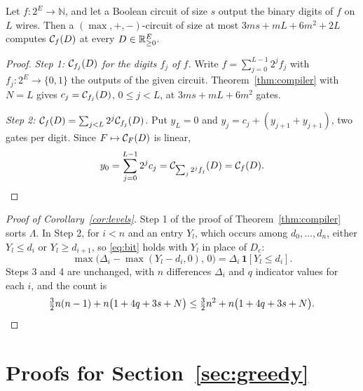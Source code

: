 \begin{corollary}
\label{cor:integer}
Let $f:2^{E}\to\mathbb N$, and let a Boolean circuit of size $s$ output the
binary digits of $f$ on $L$ wires.  Then a $(\max,+,-)$-circuit of size at
most $3ms+mL+6m^{2}+2L$ computes $\mathcal C_f(D)$ at every $D\in\mathbb R^{E}_{\ge0}$.
\end{corollary}

\begin{proof}
\emph{Step 1: $\mathcal C_{f_j}(D)$ for the digits $f_j$ of $f$.}  Write $f=\sum_{j=0}^{L-1}2^{j}f_j$ with
$f_j:2^{E}\to\{0,1\}$ the outputs of the given circuit.  Theorem~\ref{thm:compiler}
with $N=L$ gives $c_j=\mathcal C_{f_j}(D)$, $0\le j<L$, at $3ms+mL+6m^{2}$ gates.

\emph{Step 2: $\mathcal C_f(D)=\sum_{j<L}2^{j}\mathcal C_{f_j}(D)$.}  Put $y_L=0$ and $y_j=c_j+(y_{j+1}+y_{j+1})$, two
gates per digit.  Since $F\mapsto\mathcal C_F(D)$ is linear,
\[
  y_0=\sum_{j=0}^{L-1}2^{j}c_j=\mathcal C_{\sum_j2^{j}f_j}(D)=\mathcal C_f(D).\qedhere
\]
\end{proof}

\begin{proof}[Proof of Corollary~\ref{cor:levels}]
Step 1 of the proof of Theorem~\ref{thm:compiler} sorts $\Lambda$.  In Step 2, for
$i<n$ and an entry $Y_l$, which occurs among $d_0,\ldots,d_n$, either $Y_l\le d_i$
or $Y_l\ge d_{i+1}$, so \eqref{eq:bit} holds with $Y_l$ in place of $D_e$:
\[
  \max\bigl(\Delta_i-\max(Y_l-d_i,0),\,0\bigr)=\Delta_i\,\mathbf 1[Y_l\le d_i].
\]
Steps 3 and 4 are unchanged, with $n$ differences $\Delta_i$ and $q$ indicator values for each $i$, and
the count is
\[
  \tfrac32n(n-1)+n\bigl(1+4q+3s+N\bigr)\le\tfrac32n^{2}+n\bigl(1+4q+3s+N\bigr).\qedhere
\]
\end{proof}

\section{Proofs for Section~\texorpdfstring{\ref{sec:greedy}}{3}}
\label{app:greedy}

